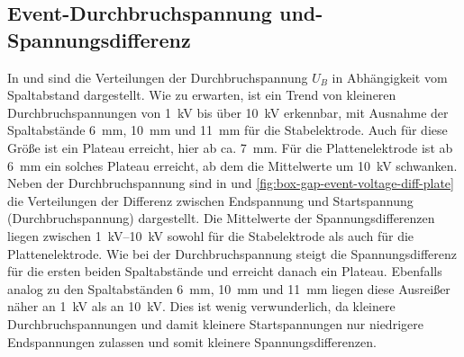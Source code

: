 \subsection{Event-Durchbruchspannung und-Spannungsdifferenz}
In  und  sind die Verteilungen der Durchbruchspannung \(U_B\) in Abhängigkeit vom Spaltabstand dargestellt. Wie zu erwarten, ist ein Trend von kleineren Durchbruchspannungen von \SI{1}{\kilo\volt} bis über \SI{10}{\kilo\volt} erkennbar, mit Ausnahme der Spaltabstände \SI{6}{\milli\meter}, \SI{10}{\milli\meter} und \SI{11}{\milli\meter} für die Stabelektrode. Auch für diese Größe ist ein Plateau erreicht, hier ab ca. \SI{7}{\milli\meter}. Für die Plattenelektrode ist ab \SI{6}{\milli\meter} ein solches Plateau erreicht, ab dem die Mittelwerte um \SI{10}{\kilo\volt} schwanken. Neben der Durchbruchspannung sind in  und \ref{fig:box-gap-event-voltage-diff-plate} die Verteilungen der Differenz zwischen Endspannung und Startspannung (Durchbruchspannung) dargestellt. Die Mittelwerte der Spannungsdifferenzen liegen zwischen \SIrange{1}{10}{\kilo\volt} sowohl für die Stabelektrode als auch für die Plattenelektrode. Wie bei der Durchbruchspannung steigt die Spannungsdifferenz für die ersten beiden Spaltabstände und erreicht danach ein Plateau. Ebenfalls analog zu den Spaltabständen \SI{6}{\milli\meter}, \SI{10}{\milli\meter} und \SI{11}{\milli\meter} liegen diese Ausreißer näher an \SI{1}{\kilo\volt} als an \SI{10}{\kilo\volt}. Dies ist wenig verwunderlich, da kleinere Durchbruchspannungen und damit kleinere Startspannungen nur niedrigere Endspannungen zulassen und somit kleinere Spannungsdifferenzen.

